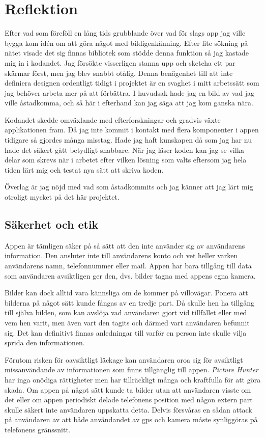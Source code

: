 \documentclass[11px, a4paper]{article}
\begin{document}
\section{Reflektion}
	Efter vad som föreföll en lång tids grubblande över vad för slags app jag ville bygga kom idén om att göra något med bildigenkänning. Efter lite sökning på nätet visade det sig finnas bibliotek som stödde denna funktion så jag kastade mig in i kodandet. Jag försökte visserligen stanna upp och sketcha ett par skärmar först, men jag blev snabbt otålig. Denna benägenhet till att inte definiera designen ordentligt tidigt i projektet är en svaghet i mitt arbetssätt som jag behöver arbeta mer på att förbättra. I huvudsak hade jag en bild av vad jag ville åstadkomma, och så här i efterhand kan jag säga att jag kom ganska nära.

	Kodandet skedde omväxlande med efterforskningar och gradvis växte applikationen fram. Då jag inte kommit i kontakt med flera komponenter i appen tidigare så gjordes många misstag. Hade jag haft kunskapen då som jag har nu hade det säkert gått betydligt snabbare. När jag läser koden kan jag se vilka delar som skrevs när i arbetet efter vilken lösning som valts eftersom jag hela tiden lärt mig och testat nya sätt att skriva koden.

	Överlag är jag nöjd med vad som åstadkommits och jag känner att jag lärt mig otroligt mycket på det här projektet.


\subsection{Säkerhet och etik}
	Appen är tämligen säker på så sätt att den inte använder sig av användarens information. Den ansluter inte till användarens konto och vet heller varken användarens namn, telefonnummer eller mail. Appen har bara tillgång till data som användaren avsiktligen ger den, dvs. bilder tagna med appens egna kamera.

	Bilder kan dock alltid vara kännsliga om de kommer på villovägar. Ponera att bilderna på något sätt kunde fångas av en tredje part. Då skulle hen ha tillgång till själva bilden, som kan avslöja vad användaren gjort vid tillfället eller med vem hen varit,  men även vart den tagits och därmed vart användaren befunnit sig. Det kan definitivt finnas anledningar till varför en person inte skulle vilja sprida den informationen.

	Förutom risken för oavsiktligt läckage kan användaren oroa sig för avsiktligt missanvändande av informationen som finns tillgänglig till appen. \emph{Picture Hunter} har inga onödiga rättigheter men har tillräckligt många och kraftfulla för att göra skada. Om appen på något sätt kunde ta bilder utan att användaren visste om det eller om appen periodiskt delade telefonens position med någon extern part skulle säkert inte användaren uppskatta detta. Delvis försvåras en sådan attack på användaren av att både användandet av gps och kamera måste synliggöras på telefonens gränssnitt.
\end{document}
